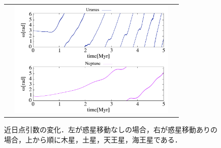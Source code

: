 \documentclass[11pt,a4paper,oneside,onecolumn]{jreport}
\begin{document}
\begin{figure}[H]
\begin{tabular}{ccc}
\begin{minipage}[t]{0.1\hsize}
\end{minipage} &
\begin{minipage}[t]{0.45\hsize}
\centering
\includegraphics[width=8cm]{./image/Move500kyr_smallomega_5Myr_URANEP.pdf}
\end{minipage}
%
\end{tabular}
\caption{近日点引数の変化．左が惑星移動なしの場合，右が惑星移動ありの場合，上から順に木星，土星，天王星，海王星である．\label{fig:omega}}
\end{figure}
\end{document}

